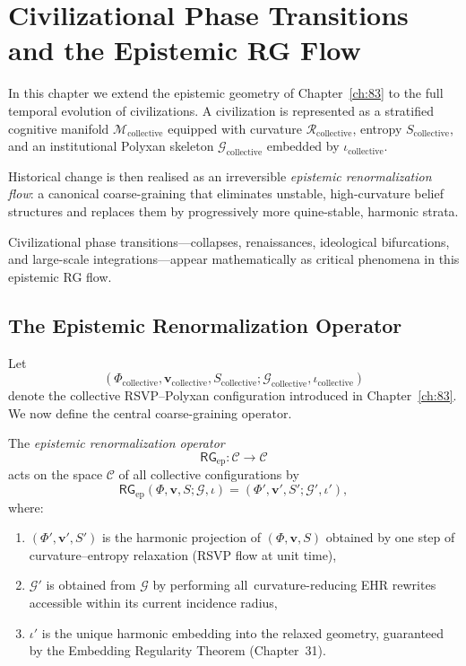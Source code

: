 \chapter{Civilizational Phase Transitions and the Epistemic RG Flow}
\label{ch:84}

In this chapter we extend the epistemic geometry of
Chapter~\ref{ch:83} to the full temporal evolution of civilizations.
A civilization is represented as a stratified cognitive manifold
$\mathcal{M}_{\mathrm{collective}}$ equipped with curvature
$\mathcal{R}_{\mathrm{collective}}$, entropy $S_{\mathrm{collective}}$,
and an institutional Polyxan skeleton
$\mathcal{G}_{\mathrm{collective}}$ embedded by
$\iota_{\mathrm{collective}}$.

Historical change is then realised as an irreversible
\emph{epistemic renormalization flow}:
a canonical coarse-graining that eliminates unstable,
high-curvature belief structures and replaces them by
progressively more quine-stable, harmonic strata.

Civilizational phase transitions---collapses, renaissances, ideological
bifurcations, and large-scale integrations---appear mathematically as
critical phenomena in this epistemic RG flow.

\section{The Epistemic Renormalization Operator}

Let
\[
(\Phi_{\mathrm{collective}},
 \mathbf{v}_{\mathrm{collective}},
 S_{\mathrm{collective}};
 \mathcal{G}_{\mathrm{collective}},
 \iota_{\mathrm{collective}})
\]
denote the collective RSVP--Polyxan configuration introduced in
Chapter~\ref{ch:83}.  We now define the central coarse-graining operator.

\begin{definition}
The \emph{epistemic renormalization operator}
\[
\mathsf{RG}_{\mathrm{ep}} :
\mathcal{C}
\to
\mathcal{C}
\]
acts on the space $\mathcal{C}$ of all collective configurations by
\[
\mathsf{RG}_{\mathrm{ep}}
(\Phi,\mathbf{v},S; \mathcal{G},\iota)
=
(\Phi',\mathbf{v}',S'; \mathcal{G}',\iota'),
\]
where:

\begin{enumerate}
\item $(\Phi',\mathbf{v}',S')$ is the harmonic projection of
      $(\Phi,\mathbf{v},S)$ obtained by one step of curvature--entropy
      relaxation (RSVP flow at unit time),
\item $\mathcal{G}'$ is obtained from $\mathcal{G}$ by performing all\
      curvature-reducing EHR rewrites accessible within its current
      incidence radius,
\item $\iota'$ is the unique harmonic embedding into the relaxed
      geometry, guaranteed by the Embedding Regularity Theorem
      (Chapter~31).
\end{enumerate}

\end{definition}

